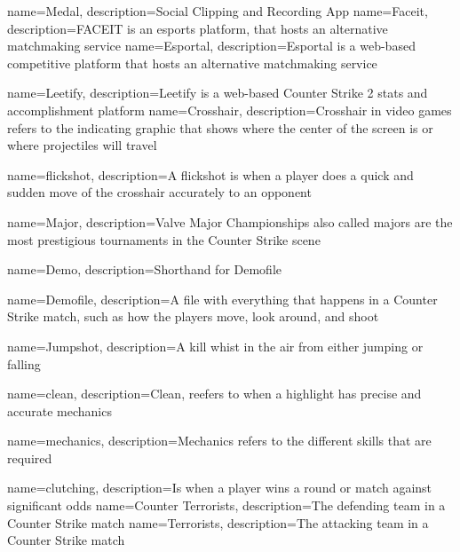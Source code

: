 {
    name=Medal,
    description={Social Clipping and Recording App}
}
{
    name=Faceit,
    description={FACEIT is an esports platform, that hosts an alternative matchmaking service}
}
{
    name=Esportal,
    description={Esportal is a web-based competitive platform that hosts an alternative matchmaking service }
}


{
    name=Leetify,
    description={Leetify is a web-based Counter Strike 2 stats and accomplishment platform}
}
{
    name=Crosshair,
    description={Crosshair in video games refers to the indicating graphic that shows where the center of the screen is or where projectiles will travel}
}

{
    name=flickshot,
    description={A flickshot is when a player does a quick and sudden move of the crosshair accurately to an opponent}
}

{
    name=Major,
    description={Valve Major Championships also called majors are the most prestigious tournaments in the Counter Strike scene}
}

{
    name=Demo,
    description={Shorthand for \Gls{Demofile}}
}

{
    name=Demofile,
    description={A file with everything that happens in a Counter Strike match, such as how the players move, look around, and shoot}
}

{
name=Jumpshot,
description={A kill whist in the air from either jumping or falling}
}

{
    name=clean,
    description={Clean, reefers to when a highlight has precise and accurate \Gls{mechanics} }
}

{
    name=mechanics,
    description={Mechanics refers to the different skills that are required }
}

{
    name=clutching,
    description={Is when a player wins a round or match against significant odds}
}
{
    name=Counter Terrorists,
    description={The defending team in a Counter Strike match}
}
{
    name=Terrorists,
    description={The attacking team in a Counter Strike match}
}

